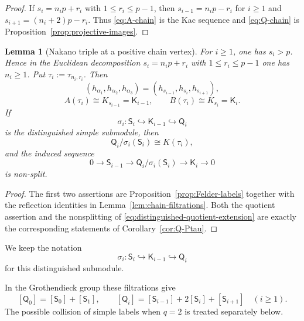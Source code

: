 \documentclass[12pt,leqno]{amsart}
\numberwithin{equation}{section}
\newtheorem{lem}[thm]{Lemma}
\begin{document}
\begin{proof}
If $s_i=n_ip+r_i$ with $1\leq r_i\leq p-1$, then
$s_{i-1}=n_ip-r_i$ for $i\ge1$ and
$s_{i+1}=(n_i+2)p-r_i$.  Thus \eqref{eq:A-chain} is the Kac sequence and
\eqref{eq:Q-chain} is Proposition~\ref{prop:projective-images}.
\end{proof}

\begin{lem}[Nakano triple at a positive chain vertex]
\label{lem:chain-Nakano-triple}
For $i\ge1$, one has $s_i>p$.  Hence in the Euclidean decomposition
$s_i=n_ip+r_i$ with $1\le r_i\le p-1$ one has $n_i\ge1$.  Put
$\tau_i:=\tau_{n_i,r_i}$.  Then
\[
 (h_{\alpha_1},h_{\alpha_2},h_{\alpha_3})
 =(h_{s_{i-1}},h_{s_i},h_{s_{i+1}}),
\]
\[
 A(\tau_i)\cong K_{s_{i-1}}=\mathsf K_{i-1},\qquad
 B(\tau_i)\cong K_{s_i}=\mathsf K_i.
\]
If
\[
 \sigma_i:\mathsf S_i\hookrightarrow\mathsf K_{i-1}
 \hookrightarrow\mathsf Q_i
\]
is the distinguished simple submodule, then
\begin{equation}\label{eq:distinguished-quotient}
 \mathsf Q_i/\sigma_i(\mathsf S_i)\cong K(\tau_i),
\end{equation}
and the induced sequence
\begin{equation}\label{eq:distinguished-quotient-extension}
 0\longrightarrow\mathsf S_{i-1}\longrightarrow
 \mathsf Q_i/\sigma_i(\mathsf S_i)\longrightarrow
 \mathsf K_i\longrightarrow0
\end{equation}
is non-split.
\end{lem}

\begin{proof}
The first two assertions are Proposition~\ref{prop:Felder-labels} together
with the reflection identities in Lemma~\ref{lem:chain-filtrations}.
Both the quotient assertion and the nonsplitting of
\eqref{eq:distinguished-quotient-extension} are exactly the corresponding
statements of Corollary~\ref{cor:Q-Ptau}.
\end{proof}

We keep the notation
\begin{equation}\label{eq:distinguished-sigma}
 \sigma_i:\mathsf S_i\hookrightarrow\mathsf K_{i-1}
 \hookrightarrow\mathsf Q_i
\end{equation}
for this distinguished submodule.

In the Grothendieck group these filtrations give
\begin{equation}\label{eq:Q-JH-vector}
 [\mathsf Q_0]=[\mathsf S_0]+[\mathsf S_1],\qquad
 [\mathsf Q_i]=[\mathsf S_{i-1}]+2[\mathsf S_i]+[\mathsf S_{i+1}]
 \quad(i\ge1).
\end{equation}
The possible collision of simple labels when $q=2$ is treated separately
below.
\end{document}

